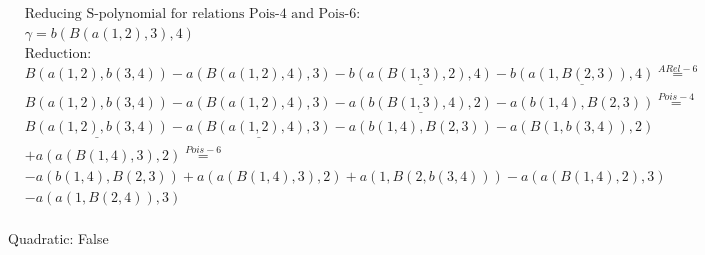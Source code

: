\documentclass[11pt]{amsart}
\begin{document}
\begin{align*} 
& \text{Reducing S-polynomial for relations Pois-4 and Pois-6:} \\ 
& \gamma = b(B(a(1,2),3),4) \\ 
& \text{Reduction}: \\&B(a(1,2),b(3,4)) - a(B(a(1,2),4),3) - \underline{b(a(B(1,3),2),4)} - \underline{b(a(1,B(2,3)),4)} \stackrel{ ARel-6 }{=}  \\ 
&B(a(1,2),b(3,4)) - a(B(a(1,2),4),3) - \underline{a(b(B(1,3),4),2)} - a(b(1,4),B(2,3)) \stackrel{ Pois-4 }{=}  \\ 
&\underline{B(a(1,2),b(3,4))} - \underline{a(B(a(1,2),4),3)} - a(b(1,4),B(2,3)) - a(B(1,b(3,4)),2)\\ 
 &  + a(a(B(1,4),3),2) \stackrel{ Pois-6 }{=}  \\ 
& - a(b(1,4),B(2,3)) + a(a(B(1,4),3),2) + a(1,B(2,b(3,4))) - a(a(B(1,4),2),3)\\ 
 &  - a(a(1,B(2,4)),3)\\ 
\end{align*} 
 

 Quadratic: False
 
\end{document}

